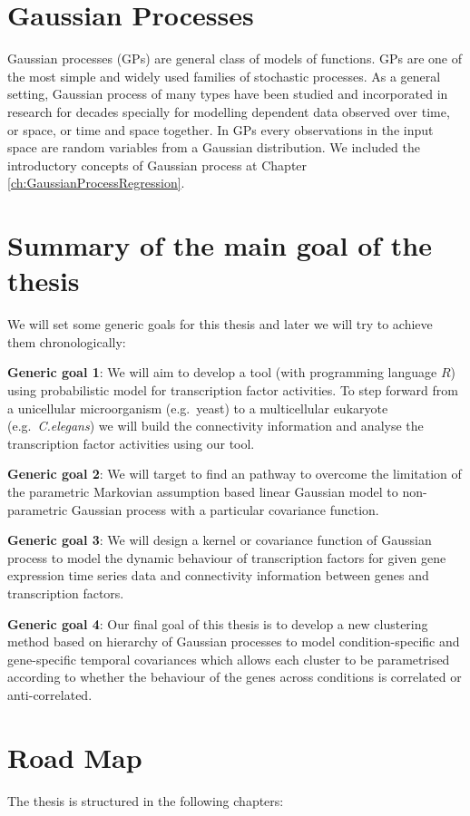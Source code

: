 \section{Gaussian Processes}
Gaussian processes (GPs) are general class of models of functions. GPs are one of the most simple and widely used families of stochastic processes. As a general setting, Gaussian process of many types have been studied and incorporated in research for decades specially for modelling dependent data observed over time, or space, or time and space together. In GPs every observations in the input space are random variables from a Gaussian distribution. We included the introductory concepts of Gaussian process at Chapter \ref{ch:GaussianProcessRegression}.

\section{Summary of the main goal of the thesis}
We will set some generic goals for this thesis and later we will try to achieve them chronologically:

\textbf{Generic goal 1}: We will aim to develop a tool (with programming language $R$) using probabilistic model for transcription factor activities. To step forward from a unicellular microorganism (e.g.\ yeast) to a multicellular eukaryote (e.g.\ \textit{C.elegans}) we will build the connectivity information and analyse the transcription factor activities using our tool.

\textbf{Generic goal 2}: We will target to find an pathway to overcome the limitation of the parametric Markovian assumption based linear Gaussian model to non-parametric Gaussian process with a particular 
covariance function.

\textbf{Generic goal 3}: We will design a kernel or covariance function of Gaussian process to model the dynamic behaviour of transcription factors for given gene expression time series data and connectivity information between genes and transcription factors.

\textbf{Generic goal 4}: Our final goal of this thesis is to develop a new clustering method based on hierarchy of Gaussian processes to model condition-specific and gene-specific temporal covariances which allows each cluster to be parametrised according to whether the behaviour of the genes across conditions is correlated or anti-correlated. 

\section{Road Map}
The thesis is structured in the following chapters:

